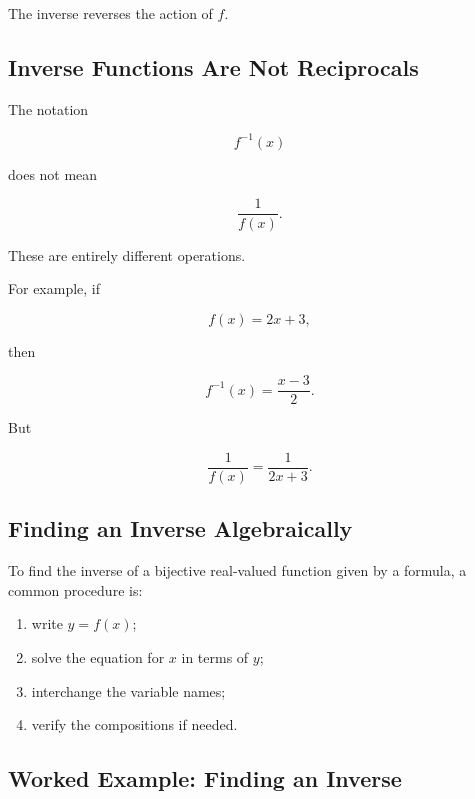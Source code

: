 The inverse reverses the action of \(f\).

\subsection{Inverse Functions Are Not Reciprocals}
\label{subsec:inverse-not-reciprocal}

The notation

\[ f^{-1}(x) \]

does not mean

\[ \frac1{f(x)}. \]

These are entirely different operations.

For example, if

\[ f(x)=2x+3, \]

then

\[ f^{-1}(x)=\frac{x-3}{2}. \]

But

\[ \frac1{f(x)}=\frac1{2x+3}. \]

\subsection{Finding an Inverse Algebraically}
\label{subsec:finding-inverse-algebraically}

To find the inverse of a bijective real-valued function given by a formula, a
common procedure is:

\begin{enumerate}
    \item write \(y=f(x)\);
    \item solve the equation for \(x\) in terms of \(y\);
    \item interchange the variable names;
    \item verify the compositions if needed.
\end{enumerate}

\subsection{Worked Example: Finding an Inverse}
\label{subsec:worked-finding-inverse}

